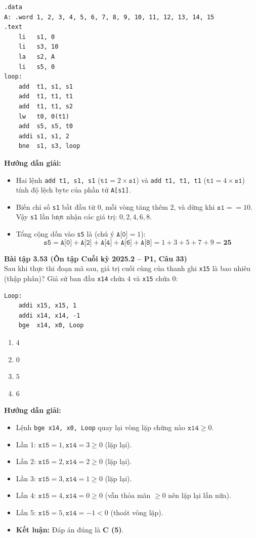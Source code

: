 \noindent\begin{minipage}{\linewidth}
\begin{lstlisting}
.data
A: .word 1, 2, 3, 4, 5, 6, 7, 8, 9, 10, 11, 12, 13, 14, 15
.text
    li   s1, 0
    li   s3, 10
    la   s2, A
    li   s5, 0
loop:
    add  t1, s1, s1
    add  t1, t1, t1
    add  t1, t1, s2
    lw   t0, 0(t1)
    add  s5, s5, t0
    addi s1, s1, 2
    bne  s1, s3, loop
\end{lstlisting}
\end{minipage}
\textbf{Hướng dẫn giải:}
\begin{itemize}
    \item Hai lệnh \texttt{add t1, s1, s1} ($\texttt{t1} = 2 \times \texttt{s1}$) và \texttt{add t1, t1, t1} ($\texttt{t1} = 4 \times \texttt{s1}$) tính độ lệch byte của phần tử \texttt{A[s1]}.
    \item Biến chỉ số \texttt{s1} bắt đầu từ $0$, mỗi vòng tăng thêm $2$, và dừng khi $\texttt{s1} == 10$. Vậy \texttt{s1} lần lượt nhận các giá trị: $0, 2, 4, 6, 8$.
    \item Tổng cộng dồn vào \texttt{s5} là (chú ý $\texttt{A[0]} = 1$):
    $$\texttt{s5} = \texttt{A[0]} + \texttt{A[2]} + \texttt{A[4]} + \texttt{A[6]} + \texttt{A[8]} = 1 + 3 + 5 + 7 + 9 = \mathbf{25}$$
\end{itemize}

\textbf{Bài tập 3.53 (Ôn tập Cuối kỳ 2025.2 -- P1, Câu 33)}\\
Sau khi thực thi đoạn mã sau, giá trị cuối cùng của thanh ghi \texttt{x15} là bao nhiêu (thập phân)? Giả sử ban đầu \texttt{x14} chứa $4$ và \texttt{x15} chứa $0$:

\noindent\begin{minipage}{\linewidth}
\begin{lstlisting}
Loop:
    addi x15, x15, 1
    addi x14, x14, -1
    bge  x14, x0, Loop
\end{lstlisting}
\end{minipage}
\begin{enumerate}[label=\Alph*.]
    \item $4$
    \item $0$
    \item $5$
    \item $6$
\end{enumerate}
\textbf{Hướng dẫn giải:}
\begin{itemize}
    \item Lệnh \texttt{bge x14, x0, Loop} quay lại vòng lặp chừng nào $\texttt{x14} \ge 0$.
    \item Lần 1: $\texttt{x15} = 1, \texttt{x14} = 3 \ge 0$ (lặp lại).
    \item Lần 2: $\texttt{x15} = 2, \texttt{x14} = 2 \ge 0$ (lặp lại).
    \item Lần 3: $\texttt{x15} = 3, \texttt{x14} = 1 \ge 0$ (lặp lại).
    \item Lần 4: $\texttt{x15} = 4, \texttt{x14} = 0 \ge 0$ (vẫn thỏa mãn $\ge 0$ nên lặp lại lần nữa).
    \item Lần 5: $\texttt{x15} = 5, \texttt{x14} = -1 < 0$ (thoát vòng lặp).
    \item \textbf{Kết luận:} Đáp án đúng là \textbf{C (5)}.
\end{itemize}

